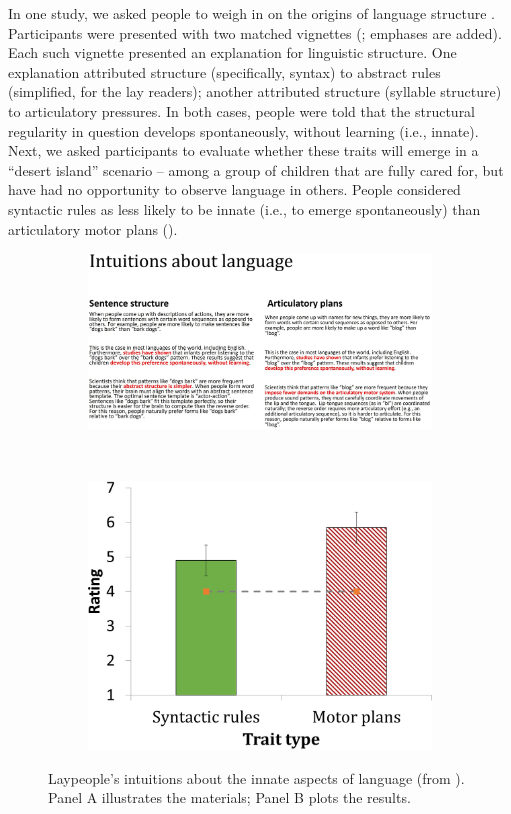 \documentclass[output=paper,colorlinks,citecolor=brown
]{langscibook}
\begin{document}
In one study, we asked people to weigh in on the origins of language structure \citep{berent2019people}. Participants were presented with two matched vignettes (; emphases are added). Each such vignette presented an explanation for linguistic structure. One explanation attributed structure (specifically, syntax) to abstract rules (simplified, for the lay readers); another attributed structure (syllable structure) to articulatory pressures.  In both cases, people were told that the structural regularity in question develops spontaneously, without learning (i.e., innate). Next, we asked participants to evaluate whether these traits will emerge in a ``desert island'' scenario -- among a group of children that are fully cared for, but have had no opportunity to observe language in others. People considered syntactic rules as less likely to be innate (i.e., to emerge spontaneously) than articulatory motor plans (). 

\begin{figure}
    \begin{subfigure}{\textwidth}
    \includegraphics[width=\textwidth,keepaspectratio]{figures/berent_figure1a.jpg}
    \caption{}\label{fig:figure1a}
    \end{subfigure}\medskip\\
    \begin{subfigure}{\textwidth}
    \centering
    \includegraphics[width=.5\textwidth,keepaspectratio]{figures/berent_figure1b.jpg}
    \caption{}\label{fig:figure1b}
    \end{subfigure}
    \caption{Laypeople’s intuitions about the innate aspects of language (from \cite{berent2019people}).  
             Panel A illustrates the materials; Panel B plots the results.}
    \label{fig:figure1}
\end{figure}
\end{document}
